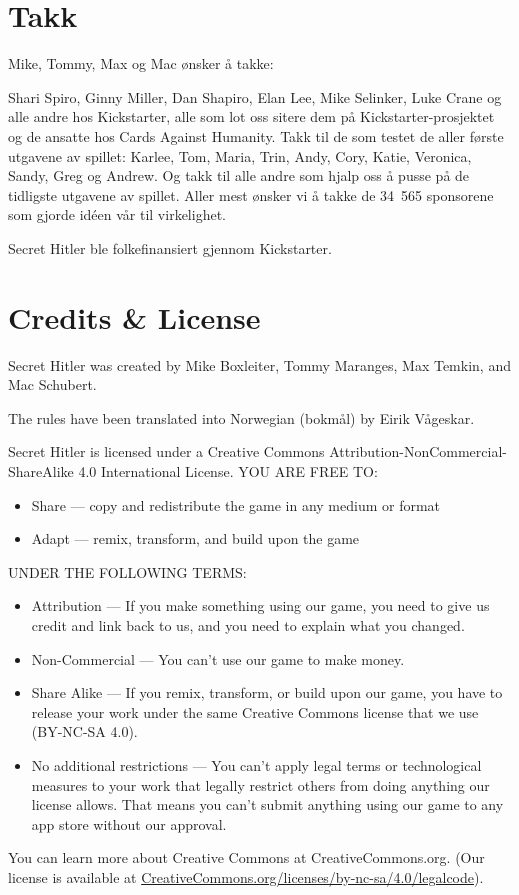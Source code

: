 \documentclass[a4paper, 10pt, twocolumn, twoside]{article}
\begin{document}
\section{Takk}
Mike, Tommy, Max og Mac ønsker å takke:

Shari Spiro, Ginny Miller, Dan Shapiro, Elan Lee, Mike Selinker, Luke Crane og alle andre hos Kickstarter, alle som lot oss sitere dem på Kickstarter-prosjektet og de ansatte hos Cards Against Humanity. Takk til de som testet de aller første utgavene av spillet: Karlee, Tom, Maria, Trin, Andy, Cory, Katie, Veronica, Sandy, Greg og Andrew. Og takk til alle andre som hjalp oss å pusse på de tidligste utgavene av spillet. Aller mest ønsker vi å takke de 34~565 sponsorene som gjorde idéen vår til virkelighet.

Secret Hitler ble folkefinansiert gjennom Kickstarter.

\section{Credits \& License}
Secret Hitler was created by Mike Boxleiter,
Tommy Maranges, Max Temkin, and Mac Schubert.

The rules have been translated into Norwegian (bokmål) by Eirik Vågeskar.

Secret Hitler is licensed under a Creative
Commons Attribution-NonCommercial-ShareAlike 4.0
International License.
YOU ARE FREE TO:
\begin{itemize}
\item Share — copy and redistribute the game in
any medium or format
\item Adapt — remix, transform, and build upon the
game
\end{itemize}
UNDER THE FOLLOWING TERMS:
\begin{itemize}
\item Attribution — If you make something using
our game, you need to give us credit and
link back to us, and you need to explain
what you changed.
\item Non-Commercial — You can’t use our game to
make money.
\item Share Alike — If you remix, transform, or
build upon our game, you have to release your
work under the same Creative Commons license
that we use (BY-NC-SA 4.0).
\item No additional restrictions — You can’t apply
legal terms or technological measures to
your work that legally restrict others from
doing anything our license allows. That
means you can’t submit anything using our
game to any app store without our approval.
\end{itemize}
You can learn more about Creative Commons at
CreativeCommons.org. (Our license is available
at \url{CreativeCommons.org/licenses/by-nc-sa/4.0/legalcode}).
\end{document}

